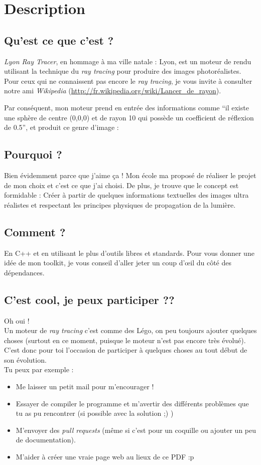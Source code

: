 \section{Description}
\subsection{Qu'est ce que c'est ?}
\textsl{Lyon Ray Tracer}, en hommage à ma ville natale : Lyon, est un moteur
de rendu utilisant la technique du \textsl{ray tracing} pour produire des
images photoréalistes. Pour ceux qui ne connaissent pas encore le \textsl{ray
tracing}, je vous invite à consulter notre ami \textsl{Wikipedia}
(\url{http://fr.wikipedia.org/wiki/Lancer_de_rayon}).

Par conséquent, mon moteur prend en entrée des informations comme ``il existe
une sphère de centre (0,0,0) et de rayon 10 qui possède un coefficient de
réflexion de 0.5'', et produit ce genre d'image :

\subsection{Pourquoi ?}
Bien évidemment parce que j'aime ça ! Mon école ma proposé de réaliser le
projet de mon choix et c'est ce que j'ai choisi. De plus, je trouve que le
concept est formidable : Créer à partir de quelques informations textuelles
des images ultra réalistes et respectant les principes physiques de propagation
de la lumière.

\subsection{Comment ?}
En C++ et en utilisant le plus d'outils libres et standards. Pour vous donner
une idée de mon toolkit, je vous conseil d'aller jeter un coup d'œil du côté
des dépendances.

\subsection{C'est cool, je peux participer ??}
Oh oui !\\

Un moteur de \textsl{ray tracing} c'est comme des Légo, on peu toujours
ajouter quelques choses (surtout en ce moment, puisque le moteur n'est pas
encore très évolué). C'est donc pour toi l'occasion de participer à quelques
choses au tout début de son évolution.\\

Tu peux par exemple :
\begin{itemize}
  \item Me laisser un petit mail pour m'encourager !
  \item Essayer de compiler le programme et m'avertir des différents problèmes
    que tu as pu rencontrer (si possible avec la solution ;) )
  \item M'envoyer des \textsl{pull requests} (même si c'est pour un coquille
    ou ajouter un peu de documentation).
  \item M'aider à créer une vraie page web au lieux de ce PDF :p
\end{itemize}

